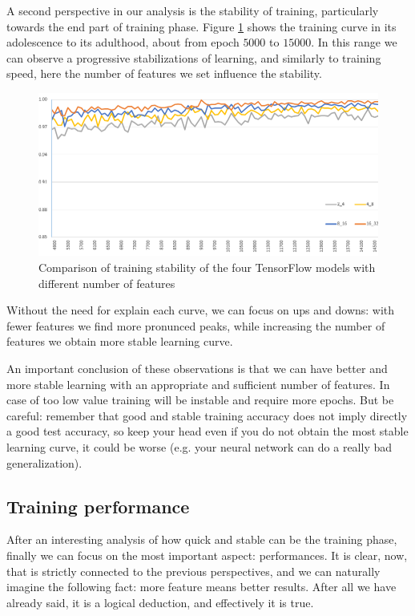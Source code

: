 A second perspective in our analysis is the stability of training, particularly towards the end part of training phase. Figure \ref{fig:training_stability} shows the training curve in its adolescence to its adulthood, about from epoch $5000$ to $15000$. In this range we can observe a progressive stabilizations of learning, and similarly to training speed, here the number of features we set influence the stability.

\begin{figure}
	\caption{Comparison of training stability of the four TensorFlow models with different number of features}
	\label{fig:training_stability}
	\centering
	\includegraphics[width=1\textwidth]{Images/training_stability}
\end{figure}

Without the need for explain each curve, we can focus on ups and downs: with fewer features we find more pronunced peaks, while increasing the number of features we obtain more stable learning curve.

An important conclusion of these observations is that we can have better and more stable learning with an appropriate and sufficient number of features. In case of too low value training will be instable and require more epochs. But be careful: remember that good and stable training accuracy does not imply directly a good test accuracy, so keep your head even if you do not obtain the most stable learning curve, it could be worse (e.g. your neural network can do a really bad generalization).

\subsection{Training performance}

After an interesting analysis of how quick and stable can be the training phase, finally we can focus on the most important aspect: performances. It is clear, now, that is strictly connected to the previous perspectives, and we can naturally imagine the following fact: more feature means better results. After all we have already said, it is a logical deduction, and effectively it is true.

